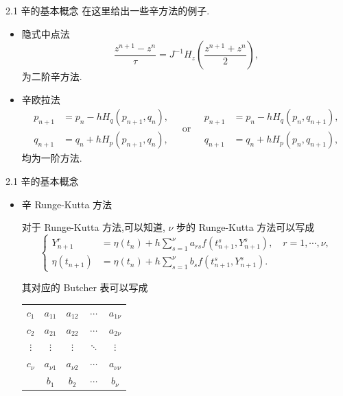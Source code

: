\documentclass{beamer}
\begin{document}
\begin{frame}{2.1 辛的基本概念}
\qquad 在这里给出一些辛方法的例子.

\begin{itemize}
\item 隐式中点法
\begin{equation*}
\frac{z^{n+1}-z^n}{\tau}=J^{-1}H_z(\frac{z^{n+1}+z^n}{2}),
\end{equation*}
为二阶辛方法.

\item 辛欧拉法
\begin{equation*}
\begin{aligned}
p_{n+1}&=p_n-hH_q(p_{n+1},q_n),\\
q_{n+1}&=q_n+hH_p(p_{n+1},q_n),
\end{aligned}
\quad \text{or} \quad
\begin{aligned}
p_{n+1}&=p_n-hH_q(p_n,q_{n+1}),\\
q_{n+1}&=q_n+hH_p(p_n,q_{n+1}),
\end{aligned}
\end{equation*}
均为一阶方法.
\end{itemize}

\end{frame}

\begin{frame}{2.1 辛的基本概念}
\begin{itemize}
\item 辛 Runge-Kutta 方法

\qquad 对于 Runge-Kutta 方法,可以知道, $\nu$ 步的 Runge-Kutta 方法可以写成
\begin{equation*}
  \left\lbrace
    \begin{aligned}
      Y_{n+1}^{r}&=\eta(t_{n})+h\sum_{s=1}^{\nu}a_{rs}f(t_{n+1}^{s},Y_{n+1}^{s}),\quad r=1,\cdots, \nu, \\
      \eta(t_{n+1})&=\eta(t_{n})+h\sum_{s=1}^{\nu}b_{s}f(t_{n+1}^{s},Y_{n+1}^{s}).
    \end{aligned}
  \right.
\end{equation*}

\qquad 其对应的 Butcher 表可以写成

\begin{center}
  \begin{tabular}{c|cccc}
    $c_1$&$a_{11}$&$a_{12}$&$\cdots$&$a_{1\nu}$\\
    $c_2$&$a_{21}$&$a_{22}$&$\cdots$&$a_{2\nu}$\\
    $\vdots$&$\vdots$&$\vdots$&$\ddots$&$\vdots$\\
    $c_{\nu}$&$a_{\nu 1}$&$a_{\nu 2}$&$\cdots$&$a_{\nu \nu}$\\
    \hline
         &$b_{1}$&$b_{2}$&$\cdots$&$b_{\nu}$
  \end{tabular}
\end{center}
\end{itemize}
\end{frame}
\end{document}
